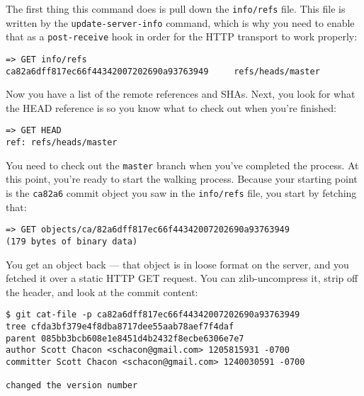 \documentclass[a4paper]{book}
\begin{document}
The first thing this command does is pull down the \texttt{info/refs} file. This file is written by the \texttt{update-server-info} command, which is why you need to enable that as a \texttt{post-receive} hook in order for the HTTP transport to work properly:

\begin{shaded}\begin{verbatim}
=> GET info/refs
ca82a6dff817ec66f44342007202690a93763949     refs/heads/master
\end{verbatim}\end{shaded}

Now you have a list of the remote references and SHAs. Next, you look for what the HEAD reference is so you know what to check out when you're finished:

\begin{shaded}\begin{verbatim}
=> GET HEAD
ref: refs/heads/master
\end{verbatim}\end{shaded}

You need to check out the \texttt{master} branch when you've completed the process. At this point, you're ready to start the walking process. Because your starting point is the \texttt{ca82a6} commit object you saw in the \texttt{info/refs} file, you start by fetching that:

\begin{shaded}\begin{verbatim}
=> GET objects/ca/82a6dff817ec66f44342007202690a93763949
(179 bytes of binary data)
\end{verbatim}\end{shaded}

You get an object back --- that object is in loose format on the server, and you fetched it over a static HTTP GET request. You can zlib-uncompress it, strip off the header, and look at the commit content:

\begin{shaded}\begin{verbatim}
$ git cat-file -p ca82a6dff817ec66f44342007202690a93763949
tree cfda3bf379e4f8dba8717dee55aab78aef7f4daf
parent 085bb3bcb608e1e8451d4b2432f8ecbe6306e7e7
author Scott Chacon <schacon@gmail.com> 1205815931 -0700
committer Scott Chacon <schacon@gmail.com> 1240030591 -0700

changed the version number
\end{verbatim}\end{shaded}
\end{document}
